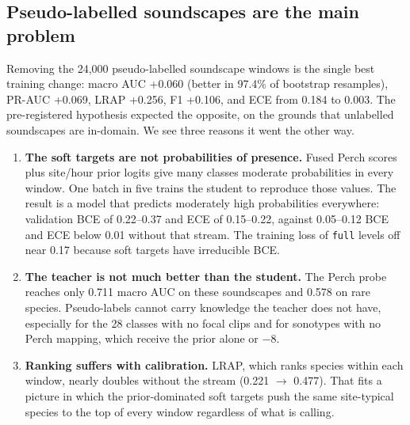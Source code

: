 \documentclass[11pt]{article}
\newcommand{\var}[1]{\texttt{#1}}
\begin{document}
\subsection{Pseudo-labelled soundscapes are the main problem}
Removing the 24{,}000 pseudo-labelled soundscape windows is the single best
training change: macro AUC +0.060 (better in 97.4\% of bootstrap resamples), PR-AUC +0.069, LRAP +0.256, F1 +0.106, and ECE from
0.184 to 0.003. The pre-registered hypothesis expected the opposite, on the
grounds that unlabelled soundscapes are in-domain. We see three reasons it
went the other way.
\begin{enumerate}
  \item \textbf{The soft targets are not probabilities of presence.} Fused
        Perch scores plus site/hour prior logits give many classes moderate
        probabilities in every window. One batch in five trains the student to
        reproduce those values. The result is a model that predicts
        moderately high probabilities everywhere: validation BCE of
        0.22--0.37 and ECE of 0.15--0.22, against 0.05--0.12 BCE and ECE
        below 0.01 without that stream. The training loss of \var{full}
        levels off near 0.17 because soft targets have irreducible BCE.
  \item \textbf{The teacher is not much better than the student.} The
        Perch probe reaches only 0.711 macro AUC on these soundscapes and
        0.578 on rare species. Pseudo-labels cannot carry knowledge the
        teacher does not have, especially for the 28 classes with no focal
        clips and for sonotypes with no Perch mapping, which receive the prior
        alone or $-8$.
  \item \textbf{Ranking suffers with calibration.} LRAP, which ranks species
        within each window, nearly doubles without the stream (0.221
        $\rightarrow$ 0.477). That fits a picture in which the prior-dominated
        soft targets push the same site-typical species to the top of every
        window regardless of what is calling.
\end{enumerate}
\end{document}
